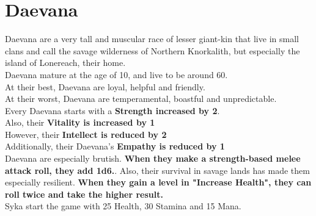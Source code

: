 \section{Daevana}
Daevana are a very tall and muscular race of lesser giant-kin that live in small clans and call the savage wilderness of Northern Knorkalith, but especially the island of Lonereach, their home.\\
Daevana mature at the age of 10, and live to be around 60.\\
At their best, Daevana are loyal, helpful and friendly.\\
At their worst, Daevana are temperamental, boastful and unpredictable.\\
Every Daevana starts with a \textbf{Strength increased by 2}.\\
Also, their \textbf{Vitality is increased by 1}\\
However, their \textbf{Intellect is reduced by 2}\\
Additionally, their Daevana's \textbf{Empathy is reduced by 1}\\
Daevana are especially brutish. \textbf{When they make a strength-based melee attack roll, they add 1d6.}. Also, their survival in savage lands has made them especially resilient. \textbf{When they gain a level in "Increase Health", they can roll twice and take the higher result.}\\
Syka start the game with 25 Health, 30 Stamina and 15 Mana.\\
